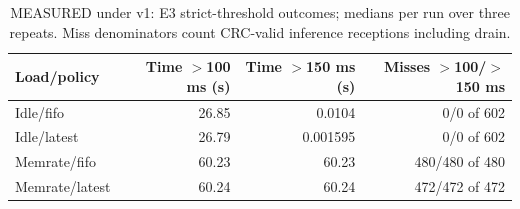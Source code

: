 \begin{table}[H]
\centering\small
\caption{MEASURED under v1: E3 strict-threshold outcomes; medians per run over three repeats. Miss denominators count CRC-valid inference receptions including drain.}\label{tab:e3_thresholds}
\begin{tabular}{lrrr}
\toprule
Load/policy & Time $>$100 ms (s) & Time $>$150 ms (s) & Misses $>$100/$>$150 ms \\
\midrule
Idle/fifo & 26.85 & 0.0104 & 0/0 of 602 \\
Idle/latest & 26.79 & 0.001595 & 0/0 of 602 \\
Memrate/fifo & 60.23 & 60.23 & 480/480 of 480 \\
Memrate/latest & 60.24 & 60.24 & 472/472 of 472 \\
\bottomrule
\end{tabular}
\end{table}
